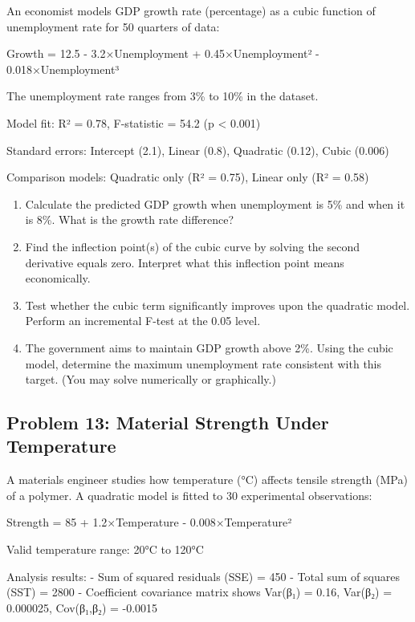 \documentclass[12pt]{article}
\begin{document}
An economist models GDP growth rate (percentage) as a cubic function of unemployment rate for 50 quarters of data:

Growth = 12.5 - 3.2×Unemployment + 0.45×Unemployment² - 0.018×Unemployment³

The unemployment rate ranges from 3\% to 10\% in the dataset.

Model fit: R² = 0.78, F-statistic = 54.2 (p < 0.001)

Standard errors: Intercept (2.1), Linear (0.8), Quadratic (0.12), Cubic (0.006)

Comparison models: Quadratic only (R² = 0.75), Linear only (R² = 0.58)

\begin{enumerate}[label=(\alph*)]
\item Calculate the predicted GDP growth when unemployment is 5\% and when it is 8\%. What is the growth rate difference?

\item Find the inflection point(s) of the cubic curve by solving the second derivative equals zero. Interpret what this inflection point means economically.

\item Test whether the cubic term significantly improves upon the quadratic model. Perform an incremental F-test at the 0.05 level.

\item The government aims to maintain GDP growth above 2\%. Using the cubic model, determine the maximum unemployment rate consistent with this target. (You may solve numerically or graphically.)
\end{enumerate}

\subsection*{Problem 13: Material Strength Under Temperature}

A materials engineer studies how temperature (°C) affects tensile strength (MPa) of a polymer. A quadratic model is fitted to 30 experimental observations:

Strength = 85 + 1.2×Temperature - 0.008×Temperature²

Valid temperature range: 20°C to 120°C

Analysis results:
- Sum of squared residuals (SSE) = 450
- Total sum of squares (SST) = 2800
- Coefficient covariance matrix shows Var(β₁) = 0.16, Var(β₂) = 0.000025, Cov(β₁,β₂) = -0.0015
\end{document}
